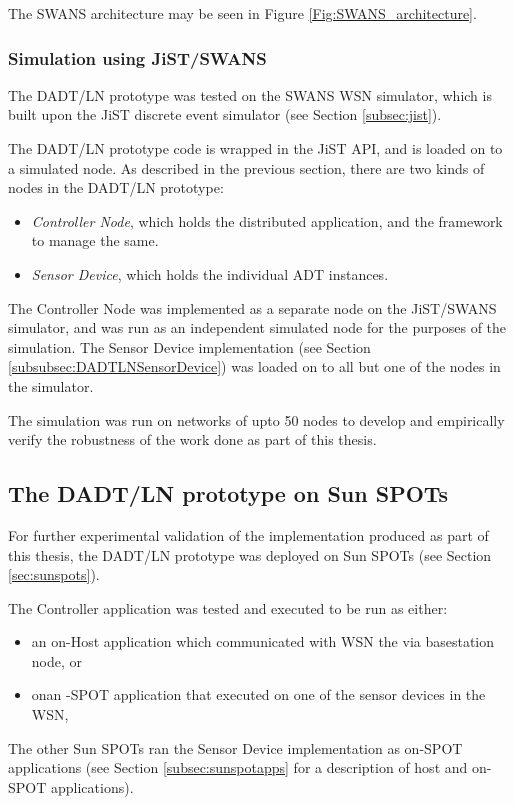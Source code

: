 The SWANS architecture may be seen in Figure \ref{Fig:SWANS_architecture}. 


\subsubsection{Simulation using JiST/SWANS}

The DADT/LN prototype was tested on the SWANS WSN simulator, which is built upon
the JiST discrete event simulator (see Section \ref{subsec:jist}). 

The DADT/LN prototype code is wrapped in the JiST API, and is loaded on to a
simulated node. As described in the previous section, there are two kinds of
nodes in the DADT/LN prototype:

\begin{itemize}
  \item \emph{Controller Node}, which holds the distributed application, and the
  framework to manage the same.
  \item \emph{Sensor Device}, which holds the individual ADT instances. 
\end{itemize}

The Controller Node was implemented as a separate node on the JiST/SWANS
simulator, and was run as an independent simulated node for the purposes of
the simulation. The Sensor Device implementation (see Section
\ref{subsubsec:DADTLNSensorDevice}) was loaded on to all but one of the nodes in
the simulator.

The simulation was run on networks of upto 50 nodes to develop and empirically verify the
robustness of the work done as part of this thesis.

\subsection{The DADT/LN prototype on Sun SPOTs}

For further experimental validation of the implementation produced as part of 
this thesis, the DADT/LN prototype was deployed on Sun SPOTs
\cite{simon_squawk:2006} (see Section \ref{sec:sunspots}).

The Controller application was tested and executed to be run as either:
\begin{itemize}
  \item an on-Host application which communicated with WSN the via basestation node, or 
  \item onan -SPOT application that executed on one of the sensor devices in the WSN, 
\end{itemize}
The other Sun SPOTs ran the Sensor Device implementation as on-SPOT applications
(see Section \ref{subsec:sunspotapps} for a description of host and on-SPOT
applications).

